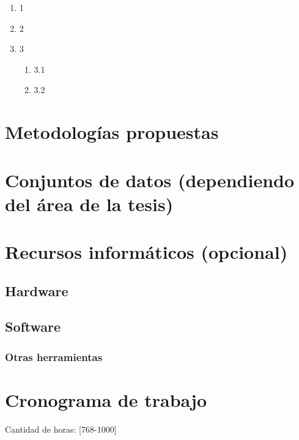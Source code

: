 \documentclass[12pt]{article}
\begin{document}
\begin{enumerate}
    \item 1
    \item 2
    \item 3
          \begin{enumerate}
              \item 3.1
              \item 3.2
          \end{enumerate}
\end{enumerate}

\bigskip

\section{Metodologías propuestas}

\bigskip

\section{Conjuntos de datos (dependiendo del área de la tesis)}

\bigskip

\section{Recursos informáticos (opcional)}

\subsection{Hardware}

\subsection{Software}

\subsubsection{Otras herramientas}

\bigskip

\section{Cronograma de trabajo}

Cantidad de horas: [768-1000]

\bigskip
\end{document}
